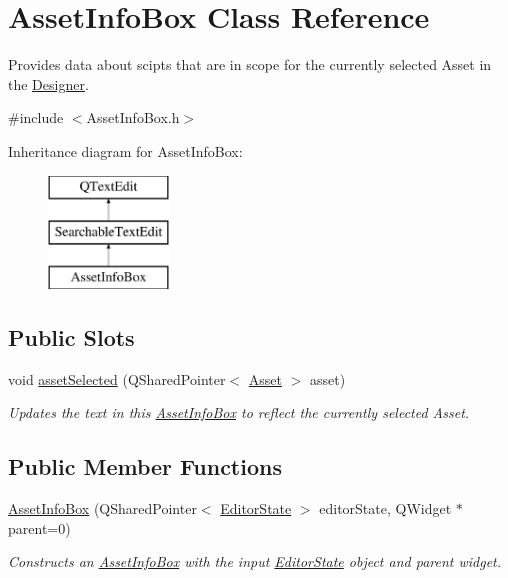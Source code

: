 \hypertarget{class_asset_info_box}{\section{Asset\-Info\-Box Class Reference}
\label{class_asset_info_box}
}


Provides data about scipts that are in scope for the currently selected Asset in the \hyperlink{class_designer}{Designer}.  




{\ttfamily \#include $<$Asset\-Info\-Box.\-h$>$}

Inheritance diagram for Asset\-Info\-Box\-:\begin{figure}[H]
\begin{center}
\leavevmode
\includegraphics[height=3.000000cm]{class_asset_info_box}
\end{center}
\end{figure}
\subsection*{Public Slots}
\begin{DoxyCompactItemize}
\item 
void \hyperlink{class_asset_info_box_a0fde649c7acc3668254a710023e4ab5f}{asset\-Selected} (Q\-Shared\-Pointer$<$ \hyperlink{class_picto_1_1_asset}{Asset} $>$ asset)
\begin{DoxyCompactList}\small\item\em Updates the text in this \hyperlink{class_asset_info_box}{Asset\-Info\-Box} to reflect the currently selected Asset. \end{DoxyCompactList}\end{DoxyCompactItemize}
\subsection*{Public Member Functions}
\begin{DoxyCompactItemize}
\item 
\hyperlink{class_asset_info_box_a9a59293528857a932675661e596bf0fe}{Asset\-Info\-Box} (Q\-Shared\-Pointer$<$ \hyperlink{class_editor_state}{Editor\-State} $>$ editor\-State, Q\-Widget $\ast$parent=0)
\begin{DoxyCompactList}\small\item\em Constructs an \hyperlink{class_asset_info_box}{Asset\-Info\-Box} with the input \hyperlink{class_editor_state}{Editor\-State} object and parent widget. \end{DoxyCompactList}\end{DoxyCompactItemize}

